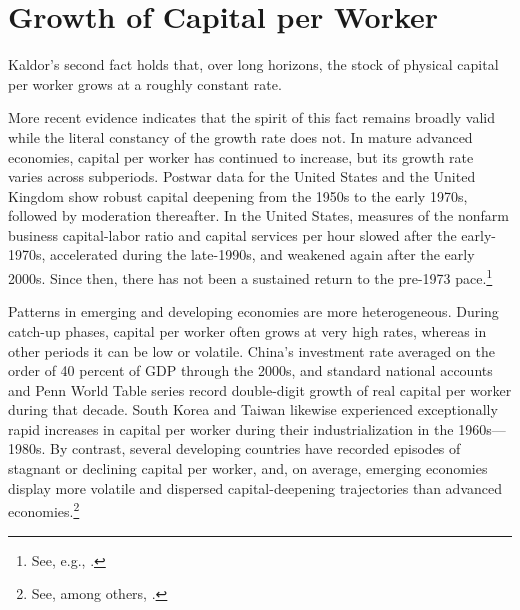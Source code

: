 \documentclass[\topdir/lecture\_notes.tex]{subfiles}
\begin{document}
\section{Growth of Capital per Worker}

Kaldor's second fact holds that, over long horizons, the stock of physical capital per worker grows at a roughly constant rate.

More recent evidence indicates that the spirit of this fact remains broadly valid while the literal constancy of the growth rate does not.
In mature advanced economies, capital per worker has continued to increase, but its growth rate varies across subperiods.
Postwar data for the United States and the United Kingdom show robust capital deepening from the 1950s to the early 1970s, followed by moderation thereafter.
In the United States, measures of the nonfarm business capital-labor ratio and capital services per hour slowed after the early-1970s, accelerated during the late-1990s, and weakened again after the early 2000s.
Since then, there has not been a sustained return to the pre-1973 pace.\footnote{See, e.g., \parencite{gordon2016rise,fernald2015productivity,jorgensonstiroh2000,olinersichel2000,jorgensonhostiroh2008,byrneolinersichel2017,herrendorf2014growth,herrendorf2019kaldor,jones2016facts}.}

Patterns in emerging and developing economies are more heterogeneous.
During catch-up phases, capital per worker often grows at very high rates, whereas in other periods it can be low or volatile.
China's investment rate averaged on the order of 40 percent of GDP through the 2000s, and standard national accounts and Penn World Table series record double-digit growth of real capital per worker during that decade.
South Korea and Taiwan likewise experienced exceptionally rapid increases in capital per worker during their industrialization in the 1960s---1980s.
By contrast, several developing countries have recorded episodes of stagnant or declining capital per worker, and, on average, emerging economies display more volatile and dispersed capital-deepening trajectories than advanced economies.\footnote{See, among others, \parencite{young1995tyranny,collinsbosworth1996,eastasianmiracle1993,jones2016facts,imf2017weo,barrosalaimartin2003,acemoglu2009growth,worldbankwdi,feenstrainklaartimmer2015pwt}.}
\end{document}
